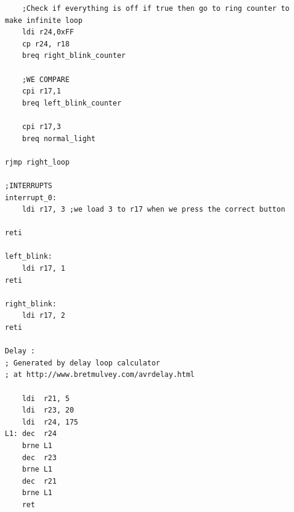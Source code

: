 \documentclass[a4paper,12pt]{article}
\begin{document}
\begin{lstlisting}
	;Check if everything is off if true then go to ring counter to make infinite loop
	ldi r24,0xFF
	cp r24, r18
	breq right_blink_counter

	;WE COMPARE
	cpi r17,1
	breq left_blink_counter

	cpi r17,3
	breq normal_light

rjmp right_loop

;INTERRUPTS
interrupt_0:
	ldi r17, 3 ;we load 3 to r17 when we press the correct button

reti

left_blink:
	ldi r17, 1
reti

right_blink:
	ldi r17, 2
reti

Delay :
; Generated by delay loop calculator
; at http://www.bretmulvey.com/avrdelay.html

	ldi  r21, 5
    ldi  r23, 20
    ldi  r24, 175
L1: dec  r24
    brne L1
    dec  r23
    brne L1
    dec  r21
    brne L1
	ret

\end{lstlisting}
\end{document}
